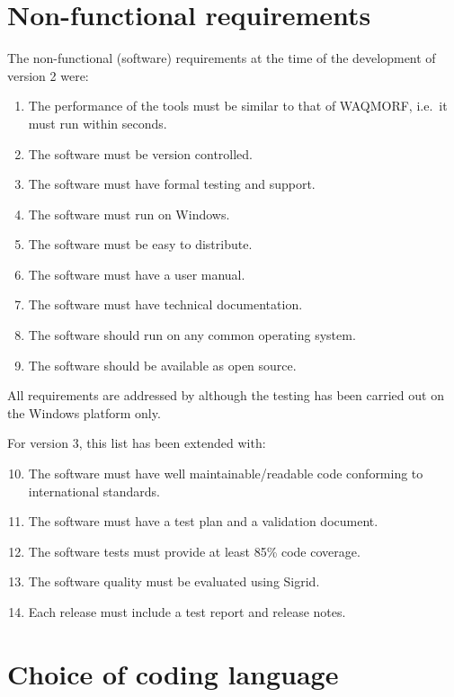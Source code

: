 \section{Non-functional requirements}

The non-functional (software) requirements at the time of the development of \dfastmi version 2 were:

\begin{enumerate}
\item The performance of the tools must be similar to that of WAQMORF, i.e.~it must run within seconds.
\item The software must be version controlled.
\item The software must have formal testing and support.
\item The software must run on Windows.
\item The software must be easy to distribute.
\item The software must have a user manual.
\item The software must have technical documentation.

\item The software should run on any common operating system.
\item The software should be available as open source.
\end{enumerate}

All requirements are addressed by \dfastmi although the testing has been carried out on the Windows platform only.

For \dfastmi version 3, this list has been extended with:

\begin{enumerate}
\setcounter{enumi}{9} %
\item The software must have well maintainable/readable code conforming to international standards.
\item The software must have a test plan and a validation document.
\item The software tests must provide at least 85\% code coverage.
\item The software quality must be evaluated using Sigrid.
\item Each release must include a test report and release notes.
\end{enumerate}

\section{Choice of coding language}

